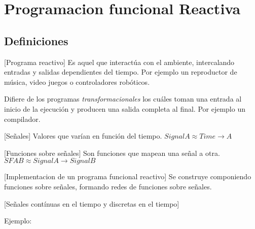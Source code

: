 
\section{Programacion funcional Reactiva}

\subsection{Definiciones}

[Programa reactivo] Es aquel que interactúa con el ambiente, 
intercalando entradas y salidas dependientes del tiempo. Por
ejemplo un reproductor de música, video juegos o controladores
robóticos.

Difiere de los programas \emph{transformacionales} los
cuáles toman una entrada al inicio de la ejecución y 
producen una salida completa al final. Por ejemplo un
compilador.

[Señales] Valores que varían en función del tiempo.
  $Signal A \approx Time \rightarrow A$

[Funciones sobre señales] Son funciones que mapean
una señal a otra.
  $SF A B \approx Signal A \rightarrow Signal B$

[Implementacion de un programa funcional reactivo] Se construye
componiendo funciones sobre señales, formando redes de funciones
sobre señales.

[Señales contínuas en el tiempo y discretas en el tiempo]


Ejemplo:


